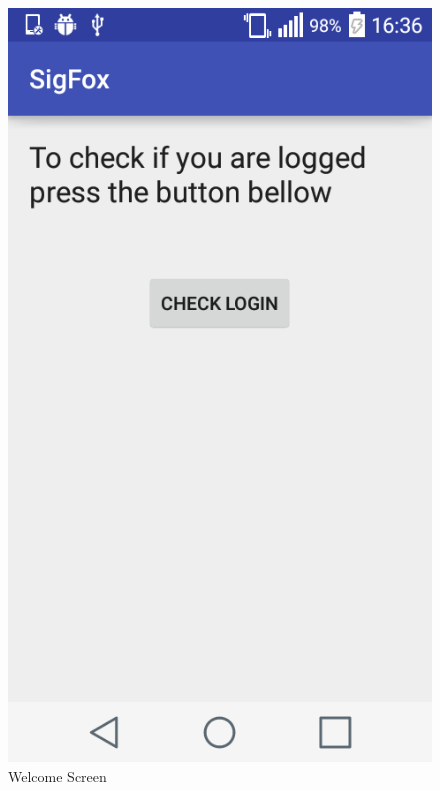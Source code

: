\documentclass[a4paper]{article}
\begin{document}
\begin{figure}[H]
  \includegraphics[width=\linewidth]{welcome.png}
  \caption{Welcome Screen}\label{fig:welcome}
\endminipage\hfill
{}

\end{figure}
\end{document}

